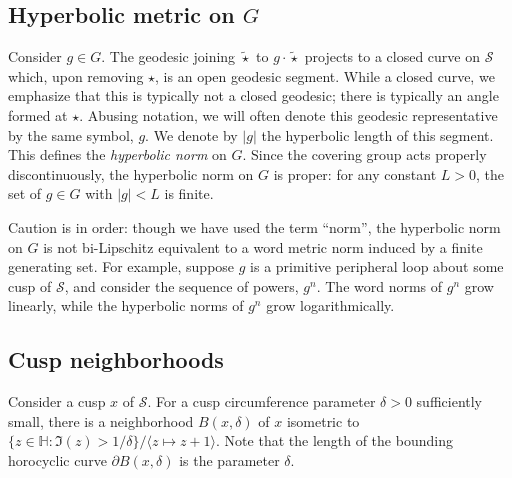 \documentclass{amsart}
\newcommand\IH{{\mathbb{H}}}
\theoremstyle{definition}
\theoremstyle{remark}
\newcommand{\cS}{\mathcal{S}}
\begin{document}
\subsection{Hyperbolic metric on $G$}
Consider $g\in G$. The geodesic joining $\tilde{\star}$ to $g \cdot \tilde{\star}$ projects to a closed curve on $\cS$ which, upon removing $\star$, is an open geodesic segment.  While a closed curve, we emphasize that this is typically not a closed geodesic; there is typically an angle formed at $\star$.  Abusing notation, we will often denote this geodesic representative by the same symbol, $g$.  We denote by $|g|$ the hyperbolic length of this segment.  This defines the \emph{hyperbolic norm} on $G$.  Since the covering group acts properly discontinuously, the hyperbolic norm on $G$ is proper: for any constant $L>0$, the set of $g\in G$ with $|g|<L$ is finite. 

Caution is in order: though we have used the term ``norm'', the hyperbolic norm on $G$ is not bi-Lipschitz equivalent to a word metric norm induced by a finite generating set. For example, suppose $g$ is a primitive peripheral loop about some cusp of $\cS$, and consider the sequence of powers, $g^n$.  The word norms of $g^n$ grow linearly, while the hyperbolic norms of $g^n$ grow logarithmically.

\subsection{Cusp neighborhoods}\label{subsecn:nbhds}
Consider a cusp $x$ of $\cS$.  For a cusp circumference parameter $\delta>0$ sufficiently small, there is a neighborhood $B(x,\delta)$ of $x$ isometric to $\{z\in\IH:\Im(z)>1/\delta\}/\langle z \mapsto z+1\rangle$.  Note that the length of the bounding horocyclic curve $\partial B(x,\delta)$ is the parameter $\delta$. 
\end{document}
